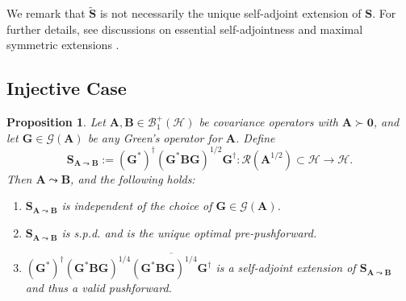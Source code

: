 \documentclass[noinfoline]{imsart}\setcounter{tocdepth}{2}
\newcommand{\m}[1]{\mathbf{#1}} %
\renewcommand{\c}[1]{\mathcal{#1}} %
\theoremstyle{plain}
\newtheorem{proposition}[theorem]{Proposition}
\begin{document}
We remark that $\tilde{\m{S}}$ is not necessarily the unique self-adjoint extension of $\m{S}$. For further details, see discussions on essential self-adjointness and maximal symmetric extensions \cite{hall2013quantum, conway2019course}.



\subsection{Injective Case}\label{ssec:reach:inf}

\begin{proposition}\label{thm:sol:injec}
Let $\m{A}, \m{B} \in \c{B}_{1}^{+}(\c{H})$ be covariance operators with $\m{A} \succ \m{0}$, and let $\m{G} \in \c{G}(\m{A})$ be any Green's operator for $\m{A}$. Define
\begin{equation*}
    \m{S}_{\m{A} \leadsto \m{B}} := (\m{G}^{*})^{\dagger} (\m{G}^{*} \m{B} \m{G})^{1/2} \m{G}^{\dagger}: \c{R}(\m{A}^{1/2}) \subset \c{H} \rightarrow \c{H}.
\end{equation*}
Then $\m{A} \leadsto \m{B}$, and the following holds:
\begin{enumerate}[leftmargin = *]
    \item $\m{S}_{\m{A} \leadsto \m{B}}$ is independent of the choice of $\m{G} \in \c{G}(\m{A})$.
    \item $\m{S}_{\m{A} \leadsto \m{B}}$ is s.p.d. and is the unique optimal pre-pushforward.
    \item $(\m{G}^{*})^{\dagger} (\m{G}^{*} \m{B} \m{G})^{1/4} \overline{(\m{G}^{*} \m{B} \m{G})^{1/4} \m{G}^{\dagger}}$ is a self-adjoint extension of $\m{S}_{\m{A} \leadsto \m{B}}$ and thus a valid pushforward.
\end{enumerate}
\end{proposition}
\end{document}
